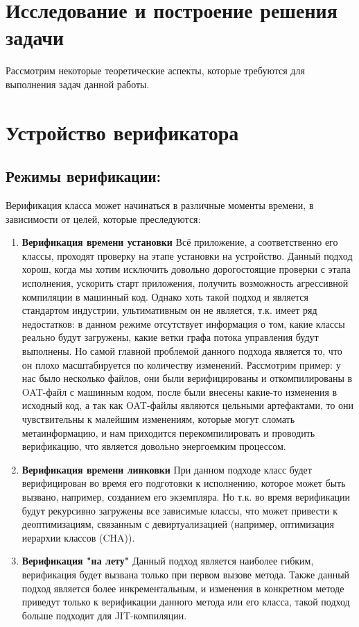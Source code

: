 \section{Исследование и построение решения задачи}
\label{sec:Chapter3} 

    Рассмотрим некоторые теоретические аспекты, которые требуются для выполнения
задач данной работы.
\section{Устройство верификатора}

\subsection{Режимы верификации:}
Верификация класса может начинаться в различные моменты времени, в зависимости от целей, которые преследуются:

\begin{enumerate}
    \item \textbf{Верификация времени установки}
    \newline
    Всё приложение, а соответственно его классы, проходят проверку на этапе установки на устройство. Данный 
    подход хорош, когда мы хотим исключить довольно дорогостоящие проверки с этапа исполнения, ускорить старт приложения,
    получить возможность агрессивной компиляции в машинный код. Однако хоть такой подход и является стандартом
    индустрии, ультимативным он не является, т.к. имеет ряд 
    недостатков: в данном режиме отсутствует информация о том, какие классы реально будут загружены, какие ветки графа потока
    управления будут выполнены. Но самой главной проблемой данного подхода является то, что он плохо масштабируется по количеству изменений. 
    Рассмотрим пример: у нас было несколько файлов, они были верифицированы и откомпилированы в OAT-файл 
    с машинным кодом, после были внесены какие-то изменения в исходный код, а так как OAT-файлы являются цельными
    артефактами, то они чувствительны к малейшим изменениям, которые могут сломать метаинформацию, и нам 
    приходится перекомпилировать и проводить верификацию, что является довольно энергоемким процессом. 
    
    \item \textbf{Верификация времени линковки}
    \newline
    При данном подходе класс будет верифицирован во время его подготовки к исполнению, которое может быть вызвано, 
    например, созданием его экземпляра. Но т.к. во время верификации будут рекурсивно загружены все зависимые классы, что
    может привести к деоптимизациям, связанным с девиртуализацией (например, оптимизация иерархии классов (CHA)).
    \item \textbf{Верификация "на лету"} 
    \newline
    Данный подход является наиболее гибким, верификация будет вызвана только при первом вызове метода. Также данный подход
    является более инкрементальным, и изменения в конкретном методе приведут только к верификации данного метода
    или его класса, такой подход больше подходит для JIT-компиляции.  
\end{enumerate}

